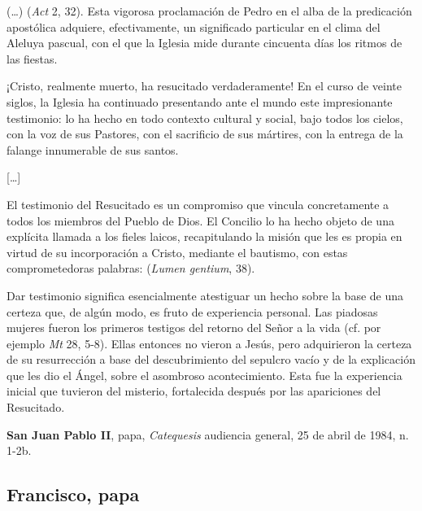 \begin{patercite}
(\ldots)  (\emph{Act} 2, 32). Esta vigorosa proclamación de Pedro en el alba de la predicación apostólica adquiere, efectivamente, un significado particular en el clima del Aleluya pascual, con el que la Iglesia mide durante cincuenta días los ritmos de las fiestas.
	
¡Cristo, realmente muerto, ha resucitado verdaderamente! En el curso de veinte siglos, la Iglesia ha continuado presentando ante el mundo este impresionante testimonio: lo ha hecho en todo contexto cultural y social, bajo todos los cielos, con la voz de sus Pastores, con el sacrificio de sus mártires, con la entrega de la falange innumerable de sus santos.
	
[\ldots]
	
El testimonio del Resucitado es un compromiso que vincula concretamente a todos los miembros del Pueblo de Dios. El Concilio lo ha hecho objeto de una explícita llamada a los fieles laicos, recapitulando la misión que les es propia en virtud de su incorporación a Cristo, mediante el bautismo, con estas comprometedoras palabras:  (\emph{Lumen gentium}, 38).
	
Dar testimonio significa esencialmente atestiguar un hecho sobre la base de una certeza que, de algún modo, es fruto de experiencia personal. Las piadosas mujeres fueron los primeros testigos del retorno del Señor a la vida (cf. por ejemplo \emph{Mt} 28, 5-8). Ellas entonces no vieron a Jesús, pero adquirieron la certeza de su resurrección a base del descubrimiento del sepulcro vacío y de la explicación que les dio el Ángel, sobre el asombroso acontecimiento. Esta fue la experiencia inicial que tuvieron del misterio, fortalecida después por las apariciones del Resucitado.
	
\textbf{San Juan Pablo II}, papa, \textit{Catequesis} audiencia general, 25 de abril de 1984, n. 1-2b. 

\end{patercite}

\newsection
\subsection{Francisco, papa}



